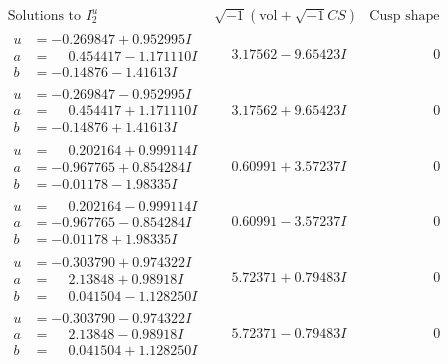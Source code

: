 \documentclass[1p]{elsarticle_modified}
\theoremstyle{definition}
\newcommand{\I}{\sqrt{-1}}
\begin{document}
$$\begin{array}{c|c|c}  
\text{Solutions to }I^u_{2}& \I (\text{vol} + \sqrt{-1}CS) & \text{Cusp shape}\\
 \hline 
\begin{aligned}
u &= -0.269847 + 0.952995 I \\
a &= \phantom{-}0.454417 - 1.171110 I \\
b &= -0.14876 - 1.41613 I\end{aligned}
 & \phantom{-}3.17562 - 9.65423 I & \phantom{-0.000000 } 0 \\ \hline\begin{aligned}
u &= -0.269847 - 0.952995 I \\
a &= \phantom{-}0.454417 + 1.171110 I \\
b &= -0.14876 + 1.41613 I\end{aligned}
 & \phantom{-}3.17562 + 9.65423 I & \phantom{-0.000000 } 0 \\ \hline\begin{aligned}
u &= \phantom{-}0.202164 + 0.999114 I \\
a &= -0.967765 + 0.854284 I \\
b &= -0.01178 - 1.98335 I\end{aligned}
 & \phantom{-}0.60991 + 3.57237 I & \phantom{-0.000000 } 0 \\ \hline\begin{aligned}
u &= \phantom{-}0.202164 - 0.999114 I \\
a &= -0.967765 - 0.854284 I \\
b &= -0.01178 + 1.98335 I\end{aligned}
 & \phantom{-}0.60991 - 3.57237 I & \phantom{-0.000000 } 0 \\ \hline\begin{aligned}
u &= -0.303790 + 0.974322 I \\
a &= \phantom{-}2.13848 + 0.98918 I \\
b &= \phantom{-}0.041504 - 1.128250 I\end{aligned}
 & \phantom{-}5.72371 + 0.79483 I & \phantom{-0.000000 } 0 \\ \hline\begin{aligned}
u &= -0.303790 - 0.974322 I \\
a &= \phantom{-}2.13848 - 0.98918 I \\
b &= \phantom{-}0.041504 + 1.128250 I\end{aligned}
 & \phantom{-}5.72371 - 0.79483 I & \phantom{-0.000000 } 0 \\ \hline\begin{aligned}

\end{aligned}
\end{array}$$
\end{document}
